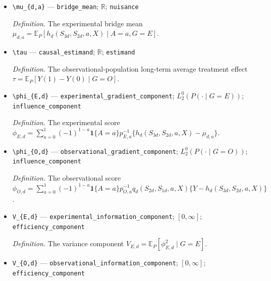 \documentclass{article}
\begin{document}
\begin{itemize}
  \par\smallskip\noindent\emph{Definition.} The weak selection-bridge seminorm \(\|u\|_{w,q,d}=\|T_d^\star u\|_{2,O,h,d}\), which measures violation of the design-specific observed selection-bridge equation.
  \item \texttt{\textbackslash{}\allowbreak{}mu\_\allowbreak{}\{d,\allowbreak{}a\}\allowbreak{}} --- \texttt{bridge\_\allowbreak{}mean}; \(\mathbb R\); \texttt{nuisance}
  \par\smallskip\noindent\emph{Definition.} The experimental bridge mean \(\mu_{d,a}=\mathbb E_P[h_d(S_{3d},S_{2d},a,X)\mid A=a,G=E]\).
  \item \texttt{\textbackslash{}\allowbreak{}tau} --- \texttt{causal\_\allowbreak{}estimand}; \(\mathbb R\); \texttt{estimand}
  \par\smallskip\noindent\emph{Definition.} The observational-population long-term average treatment effect \(\tau=\mathbb E_P[Y(1)-Y(0)\mid G=O]\).
  \item \texttt{\textbackslash{}\allowbreak{}phi\_\allowbreak{}\{E,\allowbreak{}d\}\allowbreak{}} --- \texttt{experimental\_\allowbreak{}gradient\_\allowbreak{}component}; \(L_2^0(P(\cdot\mid G=E))\); \texttt{influence\_\allowbreak{}component}
  \par\smallskip\noindent\emph{Definition.} The experimental score \(\phi_{E,d}=\sum_{a=0}^1(-1)^{1-a}\mathbf 1\{A=a\}p_{E,a}^{-1}\{h_d(S_{3d},S_{2d},a,X)-\mu_{d,a}\}\).
  \item \texttt{\textbackslash{}\allowbreak{}phi\_\allowbreak{}\{O,\allowbreak{}d\}\allowbreak{}} --- \texttt{observational\_\allowbreak{}gradient\_\allowbreak{}component}; \(L_2^0(P(\cdot\mid G=O))\); \texttt{influence\_\allowbreak{}component}
  \par\smallskip\noindent\emph{Definition.} The observational score \(\phi_{O,d}=\sum_{a=0}^1(-1)^{1-a}\mathbf 1\{A=a\}p_{O,a}^{-1}q_d(S_{2d},S_{1d},a,X)\{Y-h_d(S_{3d},S_{2d},a,X)\}\).
  \item \texttt{V\_\allowbreak{}\{E,\allowbreak{}d\}\allowbreak{}} --- \texttt{experimental\_\allowbreak{}information\_\allowbreak{}component}; \([0,\infty]\); \texttt{efficiency\_\allowbreak{}component}
  \par\smallskip\noindent\emph{Definition.} The variance component \(V_{E,d}=\mathbb E_P[\phi_{E,d}^2\mid G=E]\).
  \item \texttt{V\_\allowbreak{}\{O,\allowbreak{}d\}\allowbreak{}} --- \texttt{observational\_\allowbreak{}information\_\allowbreak{}component}; \([0,\infty]\); \texttt{efficiency\_\allowbreak{}component}

\end{itemize}
\end{document}
